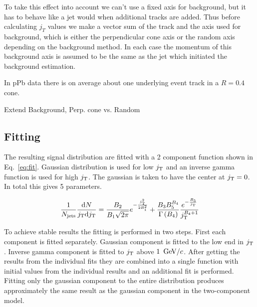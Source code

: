
To take this effect into account we can't use a fixed axis for background, but it has to behave like a jet would when additional tracks are added. Thus before calculating $j_T$ values we make a vector sum of the track and the axis used for background, which is either the perpendicular cone axis or the random axis depending on the background method. In each case the momentum of this background axis is assumed to be the same as the jet which initiated the background estimation.

In pPb data there is on average about one underlying event track in a $R = 0.4$ cone.






{\color{red} Extend Background, Perp. cone vs. Random}


 \subsection{Fitting}


The resulting signal distribution are fitted with a 2 component function shown in Eq.~\ref{eq:fit}. Gaussian distribution is used for low $j_{\rm T}$ and an inverse gamma function is used for high $j_{\rm T}$. The gaussian is taken to have the center at $j_{\rm T} = 0$. In total this gives 5 parameters.

\begin{equation}
\frac{1}{N_{\mathrm{jets}}}\frac{\mathrm{d}N}{j_{\rm T} \mathrm{d}j_{\rm T}} = \frac{B_2}{B_1\sqrt{2\pi}}e^{-\frac{j_{\rm T}^2}{2B_1^2}}+\frac{B_3B_5^{B_4}}{\Gamma\left(B_4\right)}\frac{e^{-\frac{B_5}{j_{\rm T}}}}{j_{\rm T}^{B_4+1}}
\label{eq:fit}
\end{equation}

To achieve stable results the fitting is performed in two steps. First each component is fitted separately. Gaussian component is fitted to the low end in $j_{\rm T}$. Inverse gamma component is fitted to $j_{\rm T}$ above $\unit[1]{\gevc}$. After getting the results from the individual fits they are combined into a single function with initial values from the individual results and an additional fit is performed. Fitting only the gaussian component to the entire distribution produces approximately the same result as the gaussian component in the two-component model.


